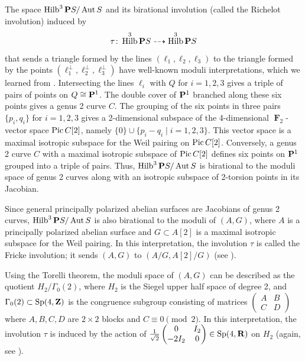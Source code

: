 \documentclass[11pt,reqno]{amsart}
\theoremstyle{plain}
\theoremstyle{definition}
\theoremstyle{remark}
\numberwithin{equation}{section}
\DeclareMathOperator{\Hilb}{Hilb}
\DeclareMathOperator{\F}{\mathbf F}
\numberwithin{equation}{section}
\begin{document}
\begin{remark}
  \label{rem:richelot}
  The space $\Hilb^3 \P S / \Aut S$ and its birational involution (called the Richelot involution) induced by
  \begin{equation}\label{eqn:richelot}
    \tau \from \Hilb^3 \P S \dashrightarrow \Hilb^3 \P S
  \end{equation}
  that sends a triangle formed by the lines $(\ell_1, \ell_2, \ell_3)$ to the triangle formed by the points $(\ell_1^\perp, \ell_2^\perp, \ell_3^\perp)$ have well-known moduli interpretations, which we learned from \cite[Example~4.2]{dol.how:15}.
  Intersecting the lines $\ell_i$ with $Q$ for $i = 1, 2, 3$ gives a triple of pairs of points on $Q \cong \P^1$.
  The double cover of $\P^1$ branched along these six points gives a genus 2 curve $C$.
  The grouping of the six points in three pairs $\{p_i, q_i\}$ for $i = 1, 2, 3$ gives a 2-dimensional subspace of the 4-dimensional $\F_2$-vector space $\Pic C [2]$, namely $\{0\} \cup \{p_i - q_i \mid i = 1,2,3\}$.
  This vector space is a maximal isotropic subspace for the Weil pairing on $\Pic C[2]$.
  Conversely, a genus 2 curve $C$ with a maximal isotropic subspace of $\Pic C[2]$ defines six points on $\P^1$ grouped into a triple of pairs.
  Thus, $\Hilb^3 \P S / \Aut S$ is birational to the moduli space of genus 2 curves along with an isotropic subspace of 2-torsion points in its Jacobian.

  Since general principally polarized abelian surfaces are Jacobians of genus 2 curves, $\Hilb^3 \P S / \Aut S$ is also birational to the moduli of $(A, G)$, where $A$ is a principally polarized abelian surface and $G \subset A[2]$ is a maximal isotropic subspace for the Weil pairing.
  In this interpretation, the involution $\tau$ is called the Fricke involution; it sends $(A, G)$ to $(A/G, A[2]/G)$ (see \cite[Page~2]{muk:12}).

  Using the Torelli theorem, the moduli space of $(A, G)$ can be described as the quotient $H_2/\Gamma_0(2)$, where $H_2$ is the Siegel upper half space of degree 2, and $\Gamma_0(2) \subset \operatorname{Sp}(4, \Z)$ is the congruence subgroup consisting of matrices $\begin{pmatrix} A & B \\ C & D \end{pmatrix}$ where $A, B, C, D$ are $2 \times 2$ blocks and $C \equiv 0 \pmod 2$.
  In this interpretation, the involution $\tau$ is induced by the action of $\frac{1}{\sqrt 2} \begin{pmatrix} 0 & I_2 \\ -2 I_2 & 0 \end{pmatrix} \in \operatorname{Sp}(4, \R)$ on $H_2$ (again, see \cite[Page~2]{muk:12}).


\end{remark}
\end{document}
